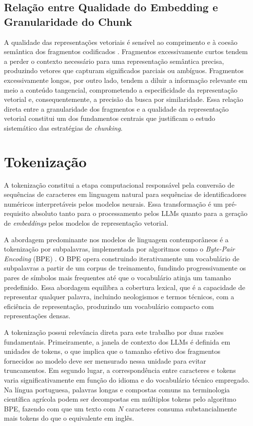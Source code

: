 \documentclass[
	12pt,				%
	openright,			%
	oneside,			%
	a4paper,			%
	tccpreliminar,		%
	]{ABNT-DC-UEL}
\begin{document}
\subsection{Relação entre Qualidade do Embedding e Granularidade do Chunk}

A qualidade das representações vetoriais é sensível ao comprimento e à coesão semântica dos fragmentos codificados \cite{salemi2024evaluating}. Fragmentos excessivamente curtos tendem a perder o contexto necessário para uma representação semântica precisa, produzindo vetores que capturam significados parciais ou ambíguos. Fragmentos excessivamente longos, por outro lado, tendem a diluir a informação relevante em meio a conteúdo tangencial, comprometendo a especificidade da representação vetorial e, consequentemente, a precisão da busca por similaridade. Essa relação direta entre a granularidade dos fragmentos e a qualidade da representação vetorial constitui um dos fundamentos centrais que justificam o estudo sistemático das estratégias de \textit{chunking}.

\section{Tokenização}
\label{sec:tokenizacao}

A tokenização constitui a etapa computacional responsável pela conversão de sequências de caracteres em linguagem natural para sequências de identificadores numéricos interpretáveis pelos modelos neurais. Essa transformação é um pré-requisito absoluto tanto para o processamento pelos LLMs quanto para a geração de \textit{embeddings} pelos modelos de representação vetorial.

A abordagem predominante nos modelos de linguagem contemporâneos é a tokenização por subpalavras, implementada por algoritmos como o \textit{Byte-Pair Encoding} (BPE) \cite{sennrich2016bpe}. O BPE opera construindo iterativamente um vocabulário de subpalavras a partir de um corpus de treinamento, fundindo progressivamente os pares de símbolos mais frequentes até que o vocabulário atinja um tamanho predefinido. Essa abordagem equilibra a cobertura lexical, que é a capacidade de representar qualquer palavra, incluindo neologismos e termos técnicos, com a eficiência de representação, produzindo um vocabulário compacto com representações densas.

A tokenização possui relevância direta para este trabalho por duas razões fundamentais. Primeiramente, a janela de contexto dos LLMs é definida em unidades de tokens, o que implica que o tamanho efetivo dos fragmentos fornecidos ao modelo deve ser mensurado nessa unidade para evitar truncamentos. Em segundo lugar, a correspondência entre caracteres e tokens varia significativamente em função do idioma e do vocabulário técnico empregado. Na língua portuguesa, palavras longas e compostas comuns na terminologia científica agrícola podem ser decompostas em múltiplos tokens pelo algoritmo BPE, fazendo com que um texto com $N$ caracteres consuma substancialmente mais tokens do que o equivalente em inglês.
\end{document}
